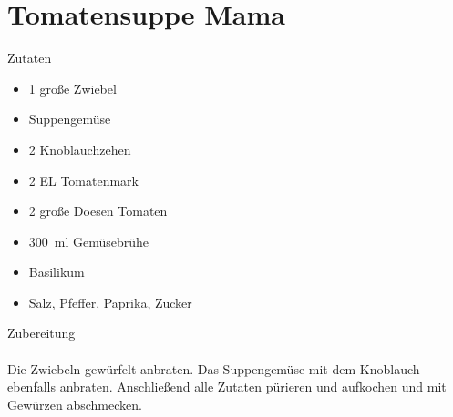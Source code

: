 \section*{Tomatensuppe Mama}
\ihead{}\ohead{}
\cfoot{}
{\Large Zutaten}
\begin{multicols}{2}
\begin{itemize}
    \item \num{1} große Zwiebel
    \item Suppengemüse
    \item \num{2} Knoblauchzehen
    \item \num{2} EL Tomatenmark
    \item \num{2} große Doesen Tomaten
    \item \SI{300}{ml} Gemüsebrühe
    \item Basilikum
    \item Salz, Pfeffer, Paprika, Zucker
\end{itemize}
\end{multicols}
\noindent
{\Large Zubereitung}\\
\\
Die Zwiebeln gewürfelt anbraten.
Das Suppengemüse mit dem Knoblauch ebenfalls anbraten.
Anschließend alle Zutaten pürieren und aufkochen und mit Gewürzen abschmecken.